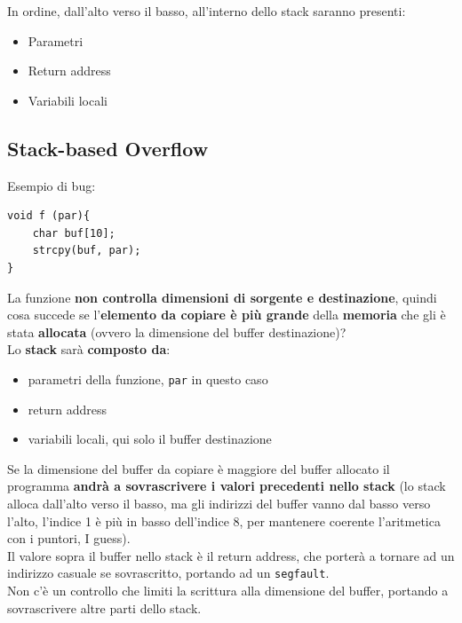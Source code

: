 In ordine, dall'alto verso il basso, all'interno dello stack saranno presenti: 
\begin{itemize}
	\item Parametri 
	\item Return address
	\item Variabili locali
\end{itemize}

\newpage

\subsection{Stack-based Overflow}

Esempio di bug: 
\begin{verbatim}
void f (par){
	char buf[10];
	strcpy(buf, par);
}
\end{verbatim}

La funzione \textbf{non controlla dimensioni di sorgente e destinazione}, quindi cosa succede se l'\textbf{elemento da copiare è più grande} della \textbf{memoria} che gli è stata \textbf{allocata} (ovvero la dimensione del buffer destinazione)?\\

Lo \textbf{stack} sarà \textbf{composto da}:
\begin{itemize}
	\item parametri della funzione, \texttt{par} in questo caso
	\item return address
	\item variabili locali, qui solo il buffer destinazione
\end{itemize} 

Se la dimensione del buffer da copiare è maggiore del buffer allocato il programma \textbf{andrà a sovrascrivere i valori precedenti nello stack} (lo stack alloca dall'alto verso il basso, ma gli indirizzi del buffer vanno dal basso verso l'alto, l'indice 1 è più in basso dell'indice 8, per mantenere coerente l'aritmetica con i puntori, I guess). \\

Il valore sopra il buffer nello stack è il return address, che porterà a tornare ad un indirizzo casuale se sovrascritto, portando ad un \texttt{segfault}.\\

Non c'è un controllo che limiti la scrittura alla dimensione del buffer, portando a sovrascrivere altre parti dello stack.\\

\newpage

